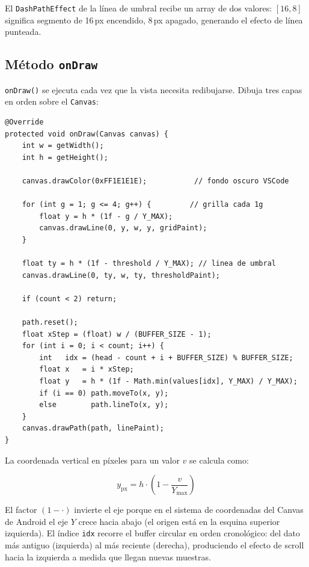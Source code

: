 \documentclass[12pt, a4paper]{article}
\begin{document}
El \texttt{DashPathEffect} de la l\'inea de umbral recibe un array de dos
valores: $[16, 8]$ significa segmento de 16\,px encendido, 8\,px apagado,
generando el efecto de l\'inea punteada.

\subsection{M\'etodo \texttt{onDraw}}

\texttt{onDraw()} se ejecuta cada vez que la vista necesita redibujarse. Dibuja
tres capas en orden sobre el \texttt{Canvas}:

\begin{lstlisting}[caption={Dibujo del gr\'afico con Canvas --- \texttt{AccelerometerGraphView.java}}]
@Override
protected void onDraw(Canvas canvas) {
    int w = getWidth();
    int h = getHeight();

    canvas.drawColor(0xFF1E1E1E);           // fondo oscuro VSCode

    for (int g = 1; g <= 4; g++) {         // grilla cada 1g
        float y = h * (1f - g / Y_MAX);
        canvas.drawLine(0, y, w, y, gridPaint);
    }

    float ty = h * (1f - threshold / Y_MAX); // linea de umbral
    canvas.drawLine(0, ty, w, ty, thresholdPaint);

    if (count < 2) return;

    path.reset();
    float xStep = (float) w / (BUFFER_SIZE - 1);
    for (int i = 0; i < count; i++) {
        int   idx = (head - count + i + BUFFER_SIZE) % BUFFER_SIZE;
        float x   = i * xStep;
        float y   = h * (1f - Math.min(values[idx], Y_MAX) / Y_MAX);
        if (i == 0) path.moveTo(x, y);
        else        path.lineTo(x, y);
    }
    canvas.drawPath(path, linePaint);
}
\end{lstlisting}

La coordenada vertical en p\'ixeles para un valor $v$ se calcula como:

\[
  y_{\text{px}} = h \cdot \left(1 - \frac{v}{Y_{\max}}\right)
\]

El factor $(1 - \cdot)$ invierte el eje porque en el sistema de coordenadas
del Canvas de Android el eje $Y$ crece hacia abajo (el origen est\'a en la
esquina superior izquierda). El \'indice \texttt{idx} recorre el buffer
circular en orden cronol\'ogico: del dato m\'as antiguo (izquierda) al m\'as
reciente (derecha), produciendo el efecto de scroll hacia la izquierda a
medida que llegan nuevas muestras.
\end{document}
